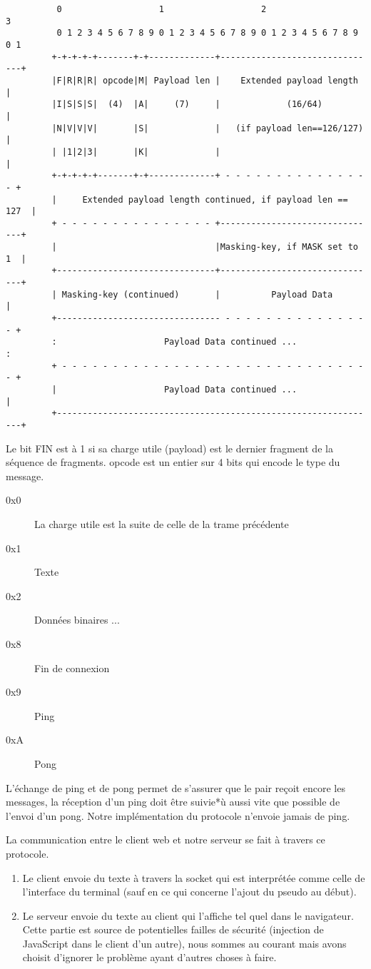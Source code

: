 \documentclass[a4paper,10pt]{article} %
\begin{document}
\begin{verbatim}
          0                   1                   2                   3
          0 1 2 3 4 5 6 7 8 9 0 1 2 3 4 5 6 7 8 9 0 1 2 3 4 5 6 7 8 9 0 1
         +-+-+-+-+-------+-+-------------+-------------------------------+
         |F|R|R|R| opcode|M| Payload len |    Extended payload length    |
         |I|S|S|S|  (4)  |A|     (7)     |             (16/64)           |
         |N|V|V|V|       |S|             |   (if payload len==126/127)   |
         | |1|2|3|       |K|             |                               |
         +-+-+-+-+-------+-+-------------+ - - - - - - - - - - - - - - - +
         |     Extended payload length continued, if payload len == 127  |
         + - - - - - - - - - - - - - - - +-------------------------------+
         |                               |Masking-key, if MASK set to 1  |
         +-------------------------------+-------------------------------+
         | Masking-key (continued)       |          Payload Data         |
         +-------------------------------- - - - - - - - - - - - - - - - +
         :                     Payload Data continued ...                :
         + - - - - - - - - - - - - - - - - - - - - - - - - - - - - - - - +
         |                     Payload Data continued ...                |
         +---------------------------------------------------------------+
\end{verbatim}

Le bit \textrm{FIN} est à 1 si sa charge utile (payload) est le dernier fragment de la séquence de fragments. \textrm{opcode} est un entier sur 4 bits qui encode le type du message.

\begin{description}
\item[0x0] La charge utile est la suite de celle de la trame précédente
\item[0x1] Texte
\item[0x2] Données binaires
  ...
\item[0x8] Fin de connexion
\item[0x9] Ping
\item[0xA] Pong
\end{description}

L'échange de ping et de pong permet de s'assurer que le pair reçoit encore les messages, la réception d'un ping doit être suivie*ù aussi vite que possible de l'envoi d'un pong. Notre implémentation du protocole n'envoie jamais de ping.

La communication entre le client web et notre serveur se fait à travers ce protocole.
\begin{enumerate}
\item Le client envoie du texte à travers la socket qui est interprétée comme celle de l'interface du terminal (sauf en ce qui concerne l'ajout du pseudo au début).
\item Le serveur envoie du texte au client qui l'affiche tel quel dans le navigateur. Cette partie est source de potentielles failles de sécurité (injection de JavaScript dans le client d'un autre), nous sommes au courant mais avons choisit d'ignorer le problème ayant d'autres choses à faire.
\end{enumerate}
\end{document}
